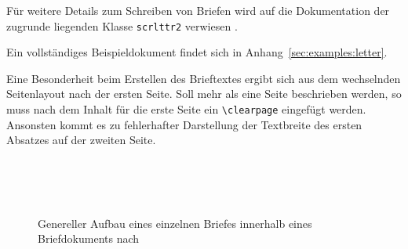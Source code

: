 Für weitere Details zum Schreiben von Briefen wird auf die Dokumentation
der zugrunde liegenden Klasse \lstinline{scrlttr2} verwiesen
\cite[S.162ff]{koma-skript}.

Ein vollständiges Beispieldokument findet sich in Anhang~\ref{sec:examples:letter}.

\begin{important}
Eine Besonderheit beim Erstellen des Brieftextes ergibt sich aus dem wechselnden
Seitenlayout nach der ersten Seite.
Soll mehr als eine Seite beschrieben werden, so muss nach
dem Inhalt für die erste Seite ein \lstinline{\clearpage} eingefügt werden.
Ansonsten kommt es zu fehlerhafter Darstellung der Textbreite des ersten
Absatzes auf der zweiten Seite.
\end{important}


\begin{figure}[!ht]
  \centering\small
  \\[1pt]
  \\[1pt]
  \\[\dp\strutbox]
  \caption[Genereller Aufbau eines einzelnen Briefes innerhalb eines
    Briefdokuments]{Genereller Aufbau eines einzelnen Briefes
    innerhalb eines Briefdokuments nach \cite[S.171]{koma-skript} }
  \label{fig:scrlttr2.letter}
\end{figure}

